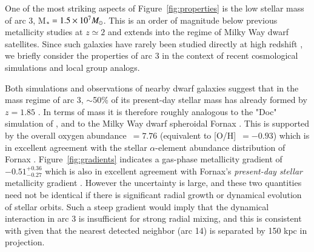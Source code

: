 One of the most striking aspects of Figure~\ref{fig:properties} is the low stellar mass of arc 3, M$_* = 1.5
\times 10^7 M_\odot$. This is an order of magnitude below previous metallicity studies at $z\simeq2$ and extends
into the regime of Milky Way dwarf satellites. Since such galaxies have rarely been studied directly at high
redshift \citep{Christensen2012,Stark2014,Atek2014}, we briefly consider the properties of arc 3 in the context
of recent cosmological simulations and local group analogs.

Both simulations and observations of nearby dwarf galaxies suggest that in the mass regime of arc 3, $\sim$50\%
of its present-day stellar mass has already formed by $z=1.85$ \citep{Shen2014,Weisz2011}. In terms of mass it is
therefore roughly analogous to the "Doc" simulation of \cite{Shen2014}, and to the Milky Way dwarf spheroidal
Fornax \citep[e.g.,][]{Coleman2008}. This is supported by the overall oxygen abundance \oh\,$=7.76$ (equivalent
to [O/H]~$=-0.93$) which is in excellent agreement with the stellar $\alpha$-element abundance distribution of
Fornax \citep{Kirby2011}. Figure~\ref{fig:gradients} indicates a gas-phase metallicity gradient of
$-0.51^{+0.36}_{-0.27}$ which is also in excellent agreement with Fornax's {\em present-day stellar} metallicity
gradient \citep[$-0.50\pm0.10$ dex\,kpc$^{-1}$;][]{Hendricks2014}. However the uncertainty is large, and these
two quantities need not be identical if there is significant radial growth or dynamical evolution of stellar
orbits. Such a steep gradient would imply that the dynamical interaction in arc 3 is insufficient for strong
radial mixing, and this is consistent with \cite{Rich2012} given that the nearest detected neighbor (arc 14) is
separated by 150 kpc in projection.

